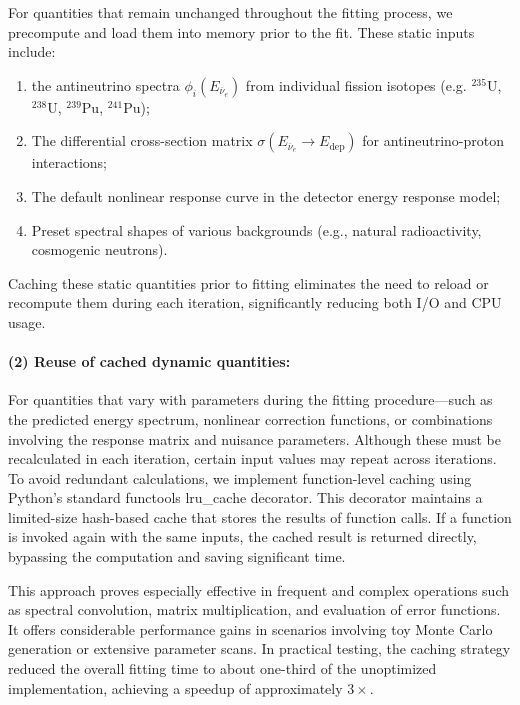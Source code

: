 \documentclass[xetex,twocolumn,epjc3]{svjour3}
\begin{document}
For quantities that remain unchanged throughout the fitting process, we precompute and load them into memory prior to the fit. These static inputs include:
\begin{enumerate}    
\item the antineutrino spectra $\phi_i(E_{\overline{\nu}_e})$ from individual fission isotopes (e.g. $^{235}$U, $^{238}$U, $^{239}$Pu, $^{241}$Pu);

\item The differential cross-section matrix $\sigma(E_{\overline{\nu}_e} \to E_{\text{dep}})$ for antineutrino-proton interactions;
    
\item The default nonlinear response curve in the detector energy response model;
    
\item Preset spectral shapes of various backgrounds (e.g., natural radioactivity, cosmogenic neutrons).
\end{enumerate}  

Caching these static quantities prior to fitting eliminates the need to reload or recompute them during each iteration, significantly reducing both I/O and CPU usage.

\paragraph{(2) Reuse of cached dynamic quantities:}

For quantities that vary with parameters during the fitting procedure—such as the predicted energy spectrum, nonlinear correction functions, or combinations involving the response matrix and nuisance parameters. Although these must be recalculated in each iteration, certain input values may repeat across iterations. To avoid redundant calculations, we implement function-level caching using Python's standard functools lru\_cache decorator. This decorator maintains a limited-size hash-based cache that stores the results of function calls. If a function is invoked again with the same inputs, the cached result is returned directly, bypassing the computation and saving significant time.

This approach proves especially effective in frequent and complex operations such as spectral convolution, matrix multiplication, and evaluation of error functions. It offers considerable performance gains in scenarios involving toy Monte Carlo generation or extensive parameter scans. In practical testing, the caching strategy reduced the overall fitting time to about one-third of the unoptimized implementation, achieving a speedup of approximately $3\times$.
\end{document}
